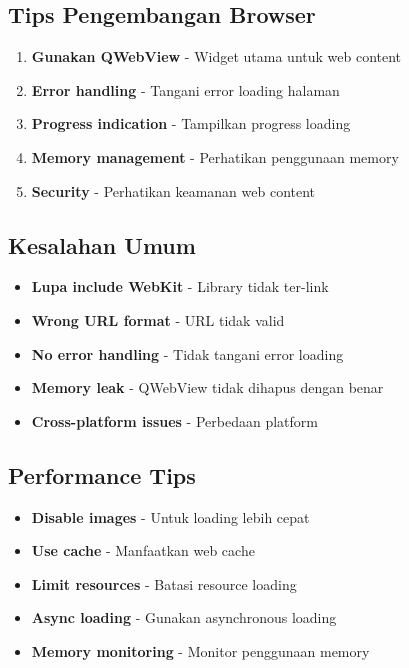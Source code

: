 \subsection{Tips Pengembangan Browser}

\begin{enumerate}
\item \textbf{Gunakan QWebView} - Widget utama untuk web content
\item \textbf{Error handling} - Tangani error loading halaman
\item \textbf{Progress indication} - Tampilkan progress loading
\item \textbf{Memory management} - Perhatikan penggunaan memory
\item \textbf{Security} - Perhatikan keamanan web content
\end{enumerate}

\subsection{Kesalahan Umum}

\begin{itemize}
\item \textbf{Lupa include WebKit} - Library tidak ter-link
\item \textbf{Wrong URL format} - URL tidak valid
\item \textbf{No error handling} - Tidak tangani error loading
\item \textbf{Memory leak} - QWebView tidak dihapus dengan benar
\item \textbf{Cross-platform issues} - Perbedaan platform
\end{itemize}

\subsection{Performance Tips}

\begin{itemize}
\item \textbf{Disable images} - Untuk loading lebih cepat
\item \textbf{Use cache} - Manfaatkan web cache
\item \textbf{Limit resources} - Batasi resource loading
\item \textbf{Async loading} - Gunakan asynchronous loading
\item \textbf{Memory monitoring} - Monitor penggunaan memory
\end{itemize}

